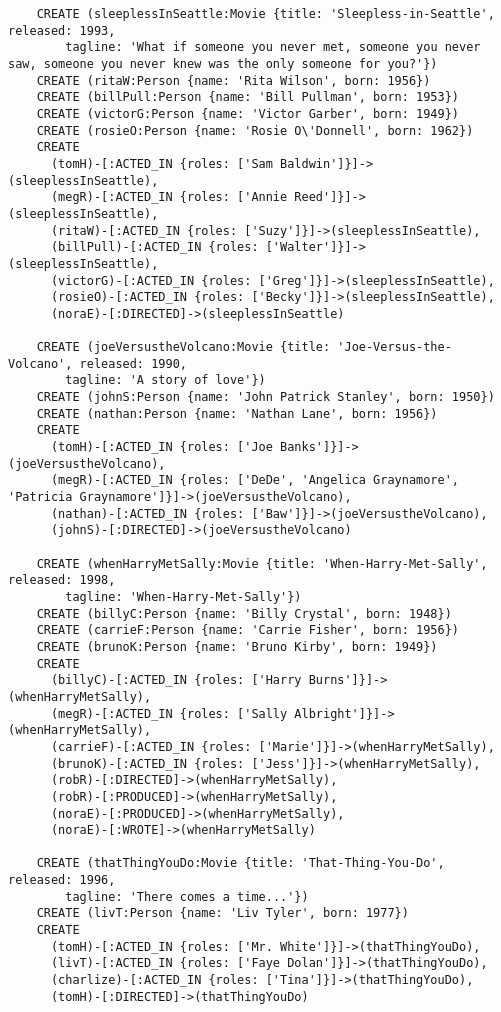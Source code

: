\begin{lstlisting}
	CREATE (sleeplessInSeattle:Movie {title: 'Sleepless-in-Seattle', released: 1993,
	    tagline: 'What if someone you never met, someone you never saw, someone you never knew was the only someone for you?'})
	CREATE (ritaW:Person {name: 'Rita Wilson', born: 1956})
	CREATE (billPull:Person {name: 'Bill Pullman', born: 1953})
	CREATE (victorG:Person {name: 'Victor Garber', born: 1949})
	CREATE (rosieO:Person {name: 'Rosie O\'Donnell', born: 1962})
	CREATE
	  (tomH)-[:ACTED_IN {roles: ['Sam Baldwin']}]->(sleeplessInSeattle),
	  (megR)-[:ACTED_IN {roles: ['Annie Reed']}]->(sleeplessInSeattle),
	  (ritaW)-[:ACTED_IN {roles: ['Suzy']}]->(sleeplessInSeattle),
	  (billPull)-[:ACTED_IN {roles: ['Walter']}]->(sleeplessInSeattle),
	  (victorG)-[:ACTED_IN {roles: ['Greg']}]->(sleeplessInSeattle),
	  (rosieO)-[:ACTED_IN {roles: ['Becky']}]->(sleeplessInSeattle),
	  (noraE)-[:DIRECTED]->(sleeplessInSeattle)
	
	CREATE (joeVersustheVolcano:Movie {title: 'Joe-Versus-the-Volcano', released: 1990,
	    tagline: 'A story of love'})
	CREATE (johnS:Person {name: 'John Patrick Stanley', born: 1950})
	CREATE (nathan:Person {name: 'Nathan Lane', born: 1956})
	CREATE
	  (tomH)-[:ACTED_IN {roles: ['Joe Banks']}]->(joeVersustheVolcano),
	  (megR)-[:ACTED_IN {roles: ['DeDe', 'Angelica Graynamore', 'Patricia Graynamore']}]->(joeVersustheVolcano),
	  (nathan)-[:ACTED_IN {roles: ['Baw']}]->(joeVersustheVolcano),
	  (johnS)-[:DIRECTED]->(joeVersustheVolcano)
	
	CREATE (whenHarryMetSally:Movie {title: 'When-Harry-Met-Sally', released: 1998,
	    tagline: 'When-Harry-Met-Sally'})
	CREATE (billyC:Person {name: 'Billy Crystal', born: 1948})
	CREATE (carrieF:Person {name: 'Carrie Fisher', born: 1956})
	CREATE (brunoK:Person {name: 'Bruno Kirby', born: 1949})
	CREATE
	  (billyC)-[:ACTED_IN {roles: ['Harry Burns']}]->(whenHarryMetSally),
	  (megR)-[:ACTED_IN {roles: ['Sally Albright']}]->(whenHarryMetSally),
	  (carrieF)-[:ACTED_IN {roles: ['Marie']}]->(whenHarryMetSally),
	  (brunoK)-[:ACTED_IN {roles: ['Jess']}]->(whenHarryMetSally),
	  (robR)-[:DIRECTED]->(whenHarryMetSally),
	  (robR)-[:PRODUCED]->(whenHarryMetSally),
	  (noraE)-[:PRODUCED]->(whenHarryMetSally),
	  (noraE)-[:WROTE]->(whenHarryMetSally)
	
	CREATE (thatThingYouDo:Movie {title: 'That-Thing-You-Do', released: 1996,
	    tagline: 'There comes a time...'})
	CREATE (livT:Person {name: 'Liv Tyler', born: 1977})
	CREATE
	  (tomH)-[:ACTED_IN {roles: ['Mr. White']}]->(thatThingYouDo),
	  (livT)-[:ACTED_IN {roles: ['Faye Dolan']}]->(thatThingYouDo),
	  (charlize)-[:ACTED_IN {roles: ['Tina']}]->(thatThingYouDo),
	  (tomH)-[:DIRECTED]->(thatThingYouDo)
	

\end{lstlisting}
